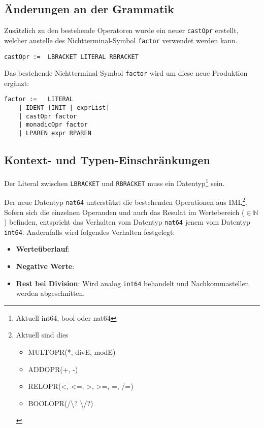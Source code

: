 \documentclass[10pt, a4paper, twocolumn]{article} %
\begin{document}
\subsection{Änderungen an der Grammatik}

Zusätzlich zu den bestehende Operatoren wurde ein neuer \texttt{castOpr} erstellt, welcher anstelle des Nichtterminal-Symbol \texttt{factor} verwendet werden kann.
\begin{lstlisting}[backgroundcolor = \color{lightgray},
xleftmargin = 0.05cm,
framexleftmargin = 0.05em]
    castOpr :=  LBRACKET LITERAL RBRACKET
\end{lstlisting}
Das bestehende Nichtterminal-Symbol \texttt{factor} wird um diese neue Produktion ergänzt:
\begin{lstlisting}[backgroundcolor = \color{lightgray},
xleftmargin = 0.05cm,
framexleftmargin = 0.05em]
    factor :=   LITERAL
    | IDENT [INIT | exprList]
    | castOpr factor
    | monadicOpr factor
    | LPAREN expr RPAREN
\end{lstlisting}

\subsection{Kontext- und Typen-Einschränkungen}
Der Literal zwischen \texttt{LBRACKET} und \texttt{RBRACKET} muss ein Datentyp\footnote{Aktuell int64, bool oder nat64} sein.

Der neue Datentyp \texttt{nat64} unterstützt die bestehenden Operationen aus IML\footnote{Aktuell sind dies \begin{itemize} \item MULTOPR(*, divE, modE) \item ADDOPR(+, -) \item RELOPR(<, <=, >, >=, =, /=) \item BOOLOPR(/\textbackslash? \textbackslash/?)\end{itemize}}.
Sofern sich die einzelnen Operanden und auch das Resulat im Wertebereich ($\in \mathbb{N}$) befinden, entspricht das Verhalten vom Datentyp \texttt{nat64} jenem vom Datentyp \texttt{int64}.
Andernfalls wird folgendes Verhalten festgelegt:

\begin{itemize}
    \item \textbf{Werteüberlauf}: %
    \item \textbf{Negative Werte}: %
    \item \textbf{Rest bei Division}: Wird analog \texttt{int64} behandelt und Nachkommastellen werden abgeschnitten.
\end{itemize}
\end{document}
